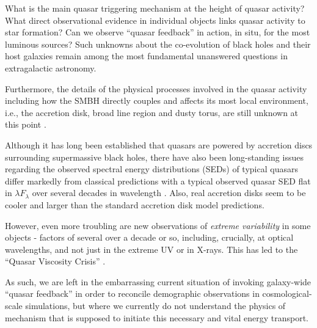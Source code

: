 \smallskip
\smallskip
\noindent
What is the main quasar triggering mechanism at the height of quasar
activity? What direct observational evidence in individual objects
links quasar activity to star formation?  Can we observe ``quasar feedback''
in action, in situ, for the most luminous sources?  Such unknowns
about the co-evolution of black holes and their host galaxies remain
among the most fundamental unanswered questions in extragalactic
astronomy.  

\smallskip 
\smallskip
\noindent
Furthermore, the details of the physical processes involved in the
quasar activity including how the SMBH directly couples and affects
its most local environment, i.e., the accretion disk, broad line
region and dusty torus, are still unknown at this point
\citep[e.g.,][]{Netzer2015, Padovani2017}.

\smallskip 
\smallskip
\noindent
Although it has long been established that quasars are powered by
accretion discs surrounding supermassive black holes, there have also
been long-standing issues regarding the observed spectral energy
distributions (SEDs) of typical quasars
\citep[e.g.,][]{Koratkar_Blaes1999, Sirko_Goodman2003} differ markedly
from classical predictions \citep[][]{SS73, Pringle1981} with a
typical observed quasar SED flat in $\lambda F_{\lambda}$ over several
decades in wavelength \citep{Elvis1994, Richards2006b}.  Also, real
accretion disks seem to be cooler \cite[e.g., ][]{Lawrence2012} and
larger \cite[e.g.,][]{Pooley2007, Morgan2010, Morgan2012,
Mosquera2011} than the standard accretion disk model predictions.

\smallskip 
\smallskip
\noindent
However, even more troubling are new observations of {\it extreme
variability} in some objects - factors of several over a decade or so,
including, crucially, at optical wavelengths, and not just in the
extreme UV or in X-rays. This has led to the ``Quasar Viscosity
Crisis'' \citep{Lawrence2018}. 

\smallskip 
\smallskip
\noindent
As such, we are left in the embarrassing current situation of invoking
galaxy-wide ``quasar feedback'' in order to reconcile demographic
observations in cosmological-scale simulations, but where we currently
do not understand the physics of mechanism that is supposed to
initiate this necessary and vital energy transport.



